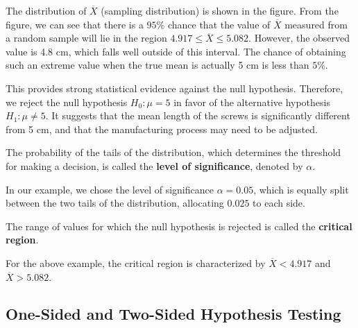 \documentclass[twoside]{book}
\begin{document}




The distribution of $\overline{X}$ (sampling distribution) is shown in the figure. From the figure, we can see that there is a $95\%$ chance that the value of $\overline{X}$ measured from a random sample will lie in the region $4.917 \leq \overline{X} \leq 5.082$. However, the observed value is 4.8 cm, which falls well outside of this interval. The chance of obtaining such an extreme value when the true mean is actually 5 cm is less than $5\%$.

This provides strong statistical evidence against the null hypothesis. Therefore, we reject the null hypothesis $H_0: \mu = 5$ in favor of the alternative hypothesis $H_1: \mu \ne 5$. It suggests that the mean length of the screws is significantly different from 5 cm, and that the manufacturing process may need to be adjusted.


\begin{textbox}
The probability of the tails of the distribution, which determines the threshold for making a decision, is called the \textbf{level of significance}, denoted by $\alpha$. 
\end{textbox}
In our example, we chose the level of significance $\alpha = 0.05$, which is equally split between the two tails of the distribution, allocating $0.025$ to each side.

\begin{textbox}
The range of values for which the null hypothesis is
rejected is called the \textbf{critical region}.    
\end{textbox}

For the above example, the critical region is characterized by $\overline{X} < 4.917$ and $\overline{X} > 5.082$.

\subsection{One-Sided and Two-Sided Hypothesis Testing}
\end{document}
